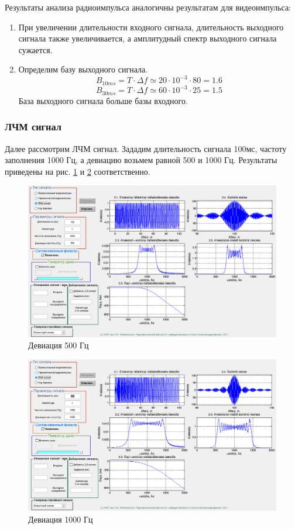 Результаты анализа радиоимпульса аналогичны результатам для видеоимпульса:
\begin{enumerate}
    \item При увеличении длительности входного сигнала, длительность выходного сигнала также увеличивается, а
    амплитудный спектр выходного сигнала сужается.
    \item Определим базу выходного сигнала. 
    \begin{equation}
        B_{10ms} = T \cdot \Delta f \simeq 20 \cdot 10^{-3} \cdot 80 = 1.6
    \end{equation}
    \begin{equation}
        B_{30ms} = T \cdot \Delta f \simeq 60 \cdot 10^{-3} \cdot 25 = 1.5
    \end{equation}
    База выходного сигнала больше базы входного.
\end{enumerate}


\subsubsection{ЛЧМ сигнал}
Далее рассмотрим ЛЧМ сигнал. Зададим длительность сигнала 100мс, частоту заполнения 1000 Гц, а
девиацию возьмем равной 500 и 1000 Гц. Результаты приведены на рис. \ref{fig:task_2_3_500} и \ref{fig:task_2_3_1000}
соответственно.
\begin{figure}[H]
    \centering
    \includegraphics[width=0.9\linewidth]{imgs/task_2/t2s3_500.png}
    \caption{Девиация 500 Гц}
    \label{fig:task_2_3_500}
\end{figure}
\begin{figure}[H]
    \centering
    \includegraphics[width=0.9\linewidth]{imgs/task_2/t2s3_1000.png}
    \caption{Девиация 1000 Гц}
    \label{fig:task_2_3_1000}
\end{figure}

